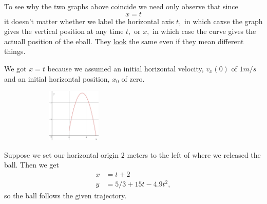 To see why the two graphs above coincide we need only observe that
since 
$$
x=t
$$
it doesn't matter whether we label the horizontal axis $t,$ in which
caxse the graph gives the vertical position at any time $t,$ or $x,$
in which case the curve gives the actuall position of the eball. They
\underline{look}  the same even if they mean different things.

We got $x=t$ because we assumed an initial horizontal velocity,
$v_x(0)$ of $1 m/s$ and an initial horizontal position, $x_0$ of
zero. 

\begin{figure}
\captionsetup{labelformat=empty}
\centerline{\includegraphics*[height=1in,width=2in]{Figures/FallingBallPath2}}
\label{fig:FallingBallPath2}
\end{figure}
Suppose we set our horizontal origin $2$ meters to the left of where
we released the ball. Then we get
\begin{align*}
  x&=t+2\\
  y&=5/3 + 15t-4.9t^2,
\end{align*}
so the ball follows the given trajectory.
